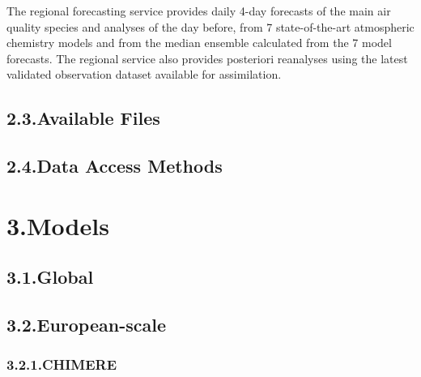 \documentclass[9pt]{report}
\begin{document}
\noindent{}The regional forecasting service provides daily 4-day forecasts of the main air quality species and analyses of the day before, from 7 state-of-the-art atmospheric chemistry models and from the median ensemble calculated from the 7 model forecasts. 
The regional service also provides posteriori reanalyses using the latest validated observation dataset available for assimilation.%

\subsection{2.3.\hspace*{0.5em}Available Files}\label{sec-available-files}%

\subsection{2.4.\hspace*{0.5em}Data Access Methods}\label{sec-data-access-methods}%

\section{3.\hspace*{0.5em}Models}\label{sec-models}%

\subsection{3.1.\hspace*{0.5em}Global}\label{sec-global}%

\subsection{3.2.\hspace*{0.5em}European-scale}\label{sec-european-scale}%

\subsubsection{3.2.1.\hspace*{0.5em}CHIMERE}\label{sec-chimere}%
\end{document}

